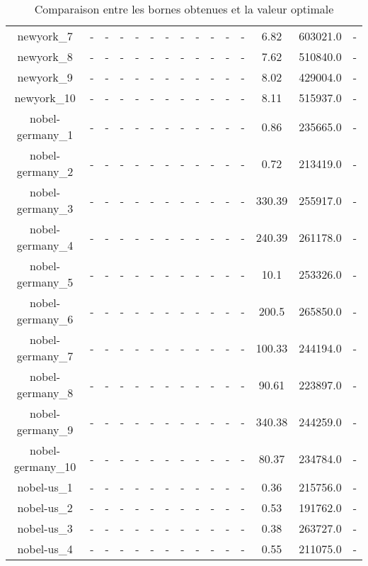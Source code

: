 \documentclass[main.tex]{subfiles}
\begin{document}
\begin{landscape}
\begin{table}[h]
\begin{tabular}{c|cc|ccc|ccc|ccc|ccc}
	newyork\_7 &- &- &- &- &- &- &- &- &- &- &- &6.82 &603021.0 &-\\
	newyork\_8 &- &- &- &- &- &- &- &- &- &- &- &7.62 &510840.0 &-\\
	newyork\_9 &- &- &- &- &- &- &- &- &- &- &- &8.02 &429004.0 &-\\
	newyork\_10 &- &- &- &- &- &- &- &- &- &- &- &8.11 &515937.0 &-\\
	nobel-germany\_1 &- &- &- &- &- &- &- &- &- &- &- &0.86 &235665.0 &-\\
	nobel-germany\_2 &- &- &- &- &- &- &- &- &- &- &- &0.72 &213419.0 &-\\
	nobel-germany\_3 &- &- &- &- &- &- &- &- &- &- &- &330.39 &255917.0 &-\\
	nobel-germany\_4 &- &- &- &- &- &- &- &- &- &- &- &240.39 &261178.0 &-\\
	nobel-germany\_5 &- &- &- &- &- &- &- &- &- &- &- &10.1 &253326.0 &-\\
	nobel-germany\_6 &- &- &- &- &- &- &- &- &- &- &- &200.5 &265850.0 &-\\
	nobel-germany\_7 &- &- &- &- &- &- &- &- &- &- &- &100.33 &244194.0 &-\\
	nobel-germany\_8 &- &- &- &- &- &- &- &- &- &- &- &90.61 &223897.0 &-\\
	nobel-germany\_9 &- &- &- &- &- &- &- &- &- &- &- &340.38 &244259.0 &-\\
	nobel-germany\_10 &- &- &- &- &- &- &- &- &- &- &- &80.37 &234784.0 &-\\
	nobel-us\_1 &- &- &- &- &- &- &- &- &- &- &- &0.36 &215756.0 &-\\
	nobel-us\_2 &- &- &- &- &- &- &- &- &- &- &- &0.53 &191762.0 &-\\
	nobel-us\_3 &- &- &- &- &- &- &- &- &- &- &- &0.38 &263727.0 &-\\
	nobel-us\_4 &- &- &- &- &- &- &- &- &- &- &- &0.55 &211075.0 &-\\
\end{tabular}\caption{Comparaison entre les bornes obtenues et la valeur optimale}
\end{table}
\end{landscape}
\newpage
\thispagestyle{empty}
\end{document}
